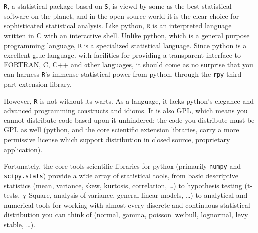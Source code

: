 \texttt{R}, a statistical package based on \texttt{S}, is viewd by some
as the best statistical software on the planet, and in the open source
world it is the clear choice for sophisticated statistical analysis.
Like python, \texttt{R} is an interpreted language written in C with an
interactive shell.  Unlike python, which is a general purpose
programming language, \texttt{R} is a specialized statistical language.
Since python is a excellent glue language, with facilities for
providing a transparent interface to FORTRAN, C, C++ and other
languages, it should come as no surprise that you can harness
\texttt{R}'s immense statistical power from python, through the
\texttt{rpy} third part extension library.

However, \texttt{R} is not without its warts.  As a language, it lacks
python's elegance and advanced programming constructs and idioms.  It
is also GPL, which means you cannot distribute code based upon it
unhindered: the code you distribute must be GPL as well (python, and
the core scientific extension libraries, carry a more permissive
license which support distribution in closed source, proprietary
application).

Fortunately, the core tools scientific libraries for python (primarily
\texttt{numpy} and \texttt{scipy.stats}) provide a wide array of
statistical tools, from basic descriptive statistics (mean, variance,
skew, kurtosis, correlation, \dots) to hypothesis testing (t-tests,
$\chi$-Square, analysis of variance, general linear models, \dots) to
analytical and numerical tools for working with almost every discrete
and continuous statistical distribution you can think of (normal,
gamma, poisson, weibull, lognormal, levy stable, \dots).



